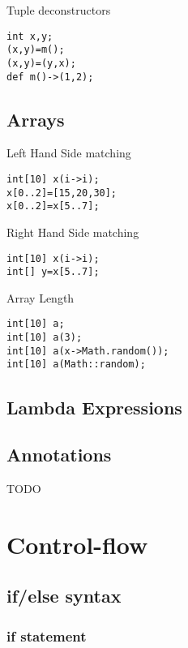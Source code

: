 \documentclass{tufte-book}
\begin{document}
            Tuple deconstructors
            \begin{lstlisting}
int x,y;
(x,y)=m();
(x,y)=(y,x);
def m()->(1,2);
            \end{lstlisting}

            \section{Arrays}

                Left Hand Side matching
                \begin{lstlisting}
int[10] x(i->i);
x[0..2]=[15,20,30];
x[0..2]=x[5..7];
                \end{lstlisting}


                Right Hand Side matching
                \begin{lstlisting}
int[10] x(i->i);
int[] y=x[5..7];
                \end{lstlisting}

                Array Length
                \begin{lstlisting}
int[10] a;
int[10] a(3);
int[10] a(x->Math.random());
int[10] a(Math::random);
                \end{lstlisting}

            \section{Lambda Expressions}
            
            \section{Annotations}
            TODO

        \chapter{Control-flow}
            \section{if/else syntax}
            \subsection{if statement}
\end{document}
